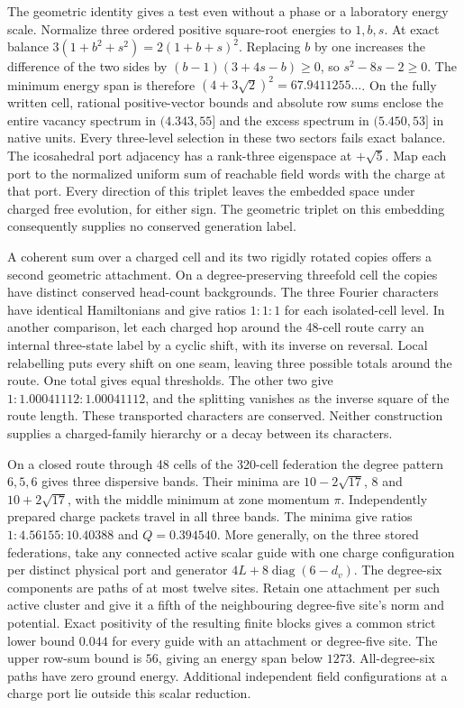 The geometric identity gives a test even without a phase or a laboratory
energy scale. Normalize three ordered positive square-root energies to
$1,b,s$. At exact balance $3(1+b^2+s^2)=2(1+b+s)^2$. Replacing $b$ by
one increases the difference of the two sides by $(b-1)(3+4s-b)\ge0$,
so $s^2-8s-2\ge0$. The minimum energy span is therefore
$(4+3\sqrt2)^2=67.9411255\ldots$. On the fully written cell, rational
positive-vector bounds and absolute row sums enclose the entire vacancy
spectrum in $(4.343,55]$ and the excess spectrum in $(5.450,53]$ in
native units. Every three-level selection in these two sectors fails
exact balance. The icosahedral port adjacency has a rank-three eigenspace
at $+\sqrt5$. Map each port to the normalized uniform sum of reachable
field words with the charge at that port. Every direction of this
triplet leaves the embedded space under charged free evolution, for either
sign. The geometric triplet on this embedding consequently supplies no
conserved generation label.

A coherent sum over a charged cell and its two rigidly rotated copies
offers a second geometric attachment. On a degree-preserving threefold
cell the copies have distinct conserved head-count backgrounds. The three
Fourier characters have identical Hamiltonians and give ratios $1:1:1$
for each isolated-cell level. In another comparison, let each charged hop
around the 48-cell route carry an internal three-state label by a cyclic
shift, with its inverse on reversal. Local relabelling puts every shift
on one seam, leaving three possible totals around the route. One total
gives equal thresholds. The other two give $1:1.00041112:1.00041112$,
and the splitting vanishes as the inverse square of the route length.
These transported characters are conserved. Neither construction supplies
a charged-family hierarchy or a decay between its characters.

On a closed route through 48 cells of the 320-cell federation the degree
pattern $6,5,6$ gives three dispersive bands. Their minima are
$10-2\sqrt{17}$, $8$ and $10+2\sqrt{17}$, with the middle minimum at
zone momentum $\pi$. Independently prepared charge packets travel in
all three bands. The minima give ratios $1:4.56155:10.40388$ and
$Q=0.394540$. More generally, on the three stored federations, take
any connected active scalar guide with one charge configuration per
distinct physical port and generator $4L+8\operatorname{diag}(6-d_v)$.
The degree-six components are paths of at most twelve sites. Retain
one attachment per such active cluster and give it a fifth of the
neighbouring degree-five site's norm and potential. Exact positivity
of the resulting finite blocks gives a common strict lower bound
$0.044$ for every guide with an attachment or degree-five site.
The upper row-sum bound is $56$, giving an energy span below $1273$.
All-degree-six paths have zero ground energy. Additional independent
field configurations at a charge port lie outside this scalar reduction.

